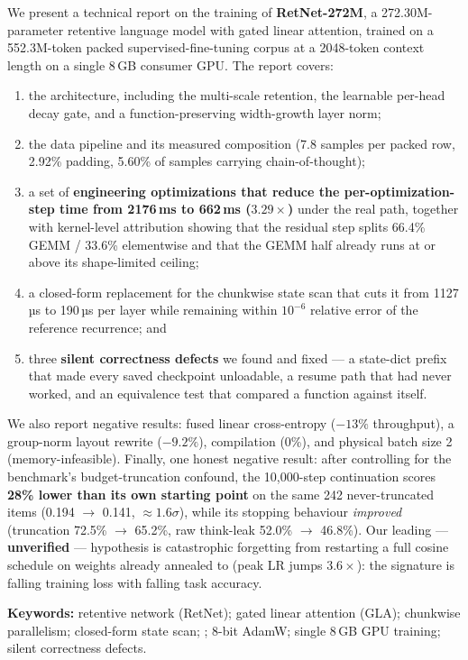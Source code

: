 We present a technical report on the training of \textbf{RetNet-272M}, a 272.30M-parameter
retentive language model with gated linear attention, trained on a 552.3M-token packed
supervised-fine-tuning corpus at a 2048-token context length on a single 8\,GB consumer
GPU. The report covers:

\begin{enumerate}
\item the architecture, including the multi-scale retention, the learnable per-head decay
      gate, and a function-preserving width-growth layer norm;
\item the data pipeline and its measured composition (7.8 samples per packed row, 2.92\%
      padding, 5.60\% of samples carrying chain-of-thought);
\item a set of \textbf{engineering optimizations that reduce the per-optimization-step time
      from 2176\,ms to 662\,ms ($3.29\times$)} under the real  path, together
      with kernel-level attribution showing that the residual step splits 66.4\% GEMM /
      33.6\% elementwise and that the GEMM half already runs at or above its
      shape-limited ceiling;
\item a closed-form replacement for the chunkwise state scan that cuts it from 1127\,µs to
      190\,µs per layer while remaining within $10^{-6}$ relative error of the reference
      recurrence; and
\item three \textbf{silent correctness defects} we found and fixed --- a 
      state-dict prefix that made every saved checkpoint unloadable, a resume path that had
      never worked, and an equivalence test that compared a function against itself.
\end{enumerate}

We also report negative results: fused linear cross-entropy ($-13\%$ throughput), a
group-norm layout rewrite ($-9.2\%$),  compilation (0\%), and physical
batch size 2 (memory-infeasible). Finally, one honest negative result: after controlling for
the benchmark's budget-truncation confound, the 10,000-step continuation scores \textbf{28\%
lower than its own starting point} on the same 242 never-truncated items (0.194 $\rightarrow$
0.141, $\approx 1.6\sigma$), while its stopping behaviour \emph{improved} (truncation
72.5\% $\rightarrow$ 65.2\%, raw think-leak 52.0\% $\rightarrow$ 46.8\%). Our leading ---
\textbf{unverified} --- hypothesis is catastrophic forgetting from restarting a full cosine
schedule on weights already annealed to  (peak LR jumps $3.6\times$): the
signature is falling training loss with falling task accuracy.

\bigskip

{\small\textbf{Keywords:} retentive network (RetNet); gated linear attention (GLA); chunkwise
parallelism; closed-form state scan; ; 8-bit AdamW; single 8\,GB GPU
training; silent correctness defects.}

\clearpage

\renewcommand{\contentsname}{Contents}
\tableofcontents

\clearpage
